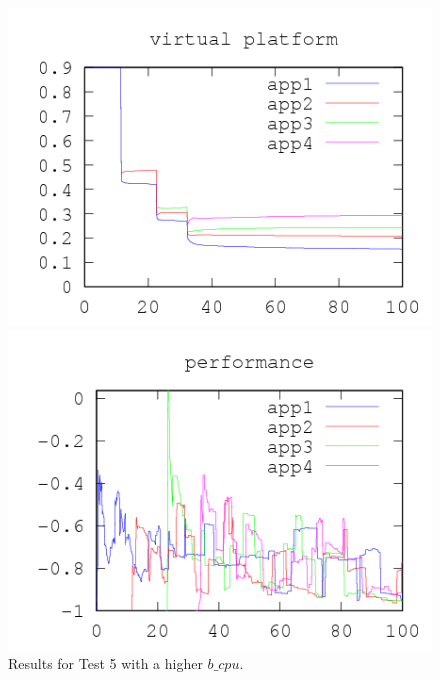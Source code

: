 \documentclass[nobiblatex]{LTHthesis}
\begin{document}
\begin{figure}[tb]
\centering
  \begin{minipage}{0.49\textwidth}
  \centering
  \includegraphics[width=\textwidth]{"tools/plot/logs/test5b/vp"}
  \end{minipage}
  \hfill
  \begin{minipage}{0.49\textwidth}
  \centering
  \includegraphics[width=\textwidth]{"tools/plot/logs/test5b/f"}
  \end{minipage}
\caption{Results for Test 5 with a higher $b\_cpu$.}
\label{fig:test5b}
\end{figure}

\newpage
\end{document}
